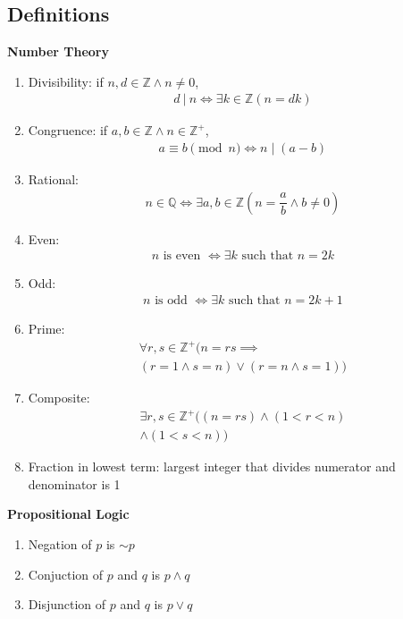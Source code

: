 \documentclass[landscape, a4paper]{article}
\newcommand{\Z}{\mathbb{Z}}
\newcommand{\Q}{\mathbb{Q}}
\newcommand{\Or}{\vee}
\renewcommand{\and}{\wedge}
\newcommand{\customsection}[1]{
    \vspace*{-16pt}
    \section*{#1}
    \vspace*{-4pt}
}
\newcommand{\heading}[1]{
    \noindent\textbf{#1}
}
\newenvironment{wenumerate}{\begin{enumerate}[wide, labelindent=2pt]}{\end{enumerate}}
\begin{document}
\begin{multicols*}{4}
    \customsection{Definitions}
    \heading{Number Theory}
    \begin{wenumerate}
        \item Divisibility: if $n,d\in \Z \and n\neq 0$,
        \begin{align*}
            d\ |\ n \iff \exists k\in\Z(n=dk)
        \end{align*}
        \item Congruence: if $a,b\in\Z \and n\in\Z^+$,
        \begin{align*}
            a\equiv b\pmod{n} \iff n\mid (a-b)
        \end{align*}
        \item Rational:
        \begin{align*}
            n\in\Q \iff \exists a,b\in\Z \left(n=\dfrac{a}{b} \and b \neq 0\right)
        \end{align*}
        \item Even:
        \begin{align*}
            n \text{ is even } \iff \exists k \text{ such that }n=2k
        \end{align*}
        \item Odd:
        \begin{align*}
            n \text{ is odd } \iff \exists k \text{ such that }n=2k+1
        \end{align*}
        \item Prime:
        \begin{multline*}
            \forall r,s\in\Z^+ (n=rs\implies \\ (r=1\and s=n) \Or (r=n \and s=1))
        \end{multline*}
        \item Composite:
        \begin{multline*}
            \exists r,s\in\Z^+ ((n=rs) \and (1<r<n)\\ \and (1<s<n))
        \end{multline*}
        \item Fraction in lowest term: largest integer that divides numerator and denominator is 1
    \end{wenumerate}
    \heading{Propositional Logic}
    \begin{wenumerate}
        \item Negation of $p$ is ${\sim} p$
        \item Conjuction of $p$ and $q$ is $p \and q$
        \item Disjunction of $p$ and $q$ is $p \Or q$

\end{wenumerate}
\end{multicols*}
\end{document}
